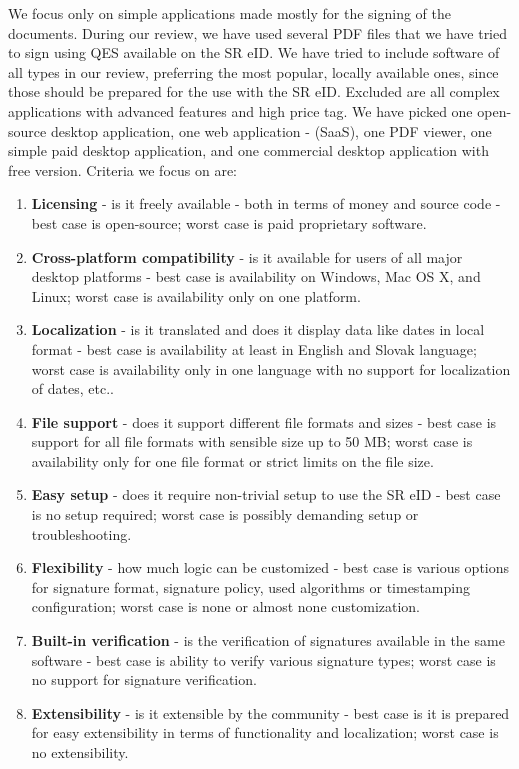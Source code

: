 \documentclass[thesismargins, english, thesislinespacing, onelinechapterstyle, upjsfrontpage]{rnthesis}
\begin{document}
We focus only on simple applications made mostly for the signing of the documents.
During our review, we have used several PDF files that we have tried to sign using QES available on the SR eID.
We have tried to include software of all types in our review, preferring the most popular, locally available ones, since those should be prepared for the use with the SR eID.
Excluded are all complex applications with advanced features and high price tag.
We have picked one open-source desktop application, one web application -  (SaaS), one PDF viewer, one simple paid desktop application, and one commercial desktop application with free version. Criteria we focus on are:

\begin{enumerate}
  \item \textbf{Licensing} - is it freely available - both in terms of money and source code - best case is open-source; worst case is paid proprietary software.
  \item \textbf{Cross-platform compatibility} - is it available for users of all major desktop platforms - best case is availability on Windows, Mac OS X, and Linux; worst case is availability only on one platform.
  \item \textbf{Localization} - is it translated and does it display data like dates in local format - best case is availability at least in English and Slovak language; worst case is availability only in one language with no support for localization of dates, etc..
  \item \textbf{File support} - does it support different file formats and sizes - best case is support for all file formats with sensible size up to 50 MB; worst case is availability only for one file format or strict limits on the file size.
  \item \textbf{Easy setup} - does it require non-trivial setup to use the SR eID - best case is no setup required; worst case is possibly demanding setup or troubleshooting.
  \item \textbf{Flexibility} - how much logic can be customized - best case is various options for signature format, signature policy, used algorithms or timestamping configuration; worst case is none or almost none customization.
  \item \textbf{Built-in verification} - is the verification of signatures available in the same software - best case is ability to verify various signature types; worst case is no support for signature verification.
  \item \textbf{Extensibility} - is it extensible by the community - best case is it is prepared for easy extensibility in terms of functionality and localization; worst case is no extensibility.
\end{enumerate}
\end{document}
